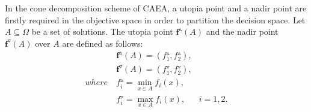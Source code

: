 \documentclass[10pt, journal]{IEEEtran}
\begin{document}
%

In the cone decomposition scheme of CAEA, a utopia point and a nadir point are firstly required in the objective space in order to partition the decision space. Let $A \subseteq \Omega$ be a set of solutions. The utopia point $\mathbf{f}^{\vartriangle}(A)$ and the nadir point $\mathbf{f}^{\triangledown}(A)$ over $A$ are defined as follows:
\begin{equation}\label{eqn:POINT}
\begin{aligned}
 &\mathbf{f}^{\vartriangle}(A) = (f{_1^{\vartriangle}},f{_2^{\vartriangle}}),&\\
 &\mathbf{f}^{\triangledown}(A) = (f{_1^{\triangledown}},f{_2^{\triangledown}}),& \\
where\ & f{_i^\vartriangle} =\mathop{min}\limits_{x \in A} f_i(x),& \\
 &f{_i^{\triangledown}} =\mathop{max}\limits_{x \in A} f_i(x),& i=1,2.
\end{aligned}
\end{equation}

%
\end{document}

